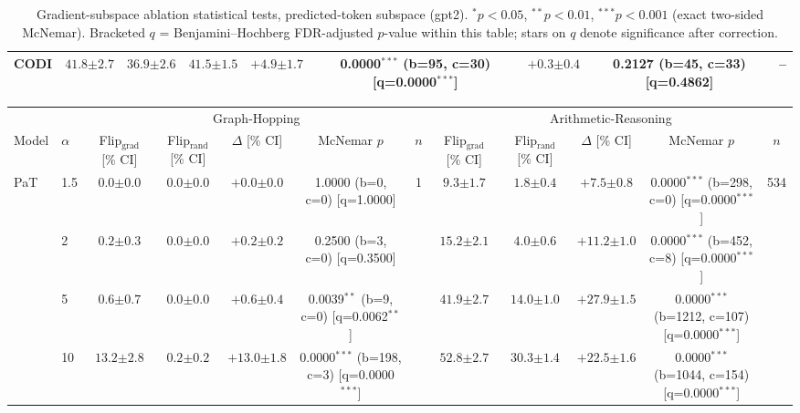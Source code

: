 \begin{table}[h!]
\begin{tabular}{l ccc cc cc c}
CODI & $41.8 {\scriptstyle \pm 2.7}$ & $36.9 {\scriptstyle \pm 2.6}$ & $41.5 {\scriptstyle \pm 1.5}$ & $+4.9 {\scriptstyle \pm 1.7}$ & 0.0000$^{***}$ (b=95, c=30) [q=0.0000$^{***}$] & $+0.3 {\scriptstyle \pm 0.4}$ & 0.2127 (b=45, c=33) [q=0.4862] & -- \\
\bottomrule
\end{tabular}
\caption{Gradient-subspace ablation statistical tests, predicted-token subspace (gpt2). $^{*}p{<}0.05$, $^{**}p{<}0.01$, $^{***}p{<}0.001$ (exact two-sided McNemar). Bracketed $q$ = Benjamini--Hochberg FDR-adjusted $p$-value within this table; stars on $q$ denote significance after correction.}
\label{tab:gradsubspace_predtoken_ablation_stats_gpt2}
\end{table}

\begin{table}[h!]
\centering
\tiny
\setlength{\tabcolsep}{3pt}
\begin{tabular}{l l | cccc c | cccc c}
\toprule
& & \multicolumn{5}{c}{Graph-Hopping} & \multicolumn{5}{c}{Arithmetic-Reasoning} \\
\cmidrule(lr){3-7} \cmidrule(lr){8-12}
Model & $\alpha$ & Flip$_{\text{grad}}$ [\% CI] & Flip$_{\text{rand}}$ [\% CI] & $\Delta$ [\% CI] & McNemar $p$ & $n$ & Flip$_{\text{grad}}$ [\% CI] & Flip$_{\text{rand}}$ [\% CI] & $\Delta$ [\% CI] & McNemar $p$ & $n$ \\
\midrule
PaT & 1.5 & $0.0 {\scriptstyle \pm 0.0}$ & $0.0 {\scriptstyle \pm 0.0}$ & $+0.0 {\scriptstyle \pm 0.0}$ & 1.0000 (b=0, c=0) [q=1.0000] & 1 & $9.3 {\scriptstyle \pm 1.7}$ & $1.8 {\scriptstyle \pm 0.4}$ & $+7.5 {\scriptstyle \pm 0.8}$ & 0.0000$^{***}$ (b=298, c=0) [q=0.0000$^{***}$] & 534 \\
 & 2 & $0.2 {\scriptstyle \pm 0.3}$ & $0.0 {\scriptstyle \pm 0.0}$ & $+0.2 {\scriptstyle \pm 0.2}$ & 0.2500 (b=3, c=0) [q=0.3500] &  & $15.2 {\scriptstyle \pm 2.1}$ & $4.0 {\scriptstyle \pm 0.6}$ & $+11.2 {\scriptstyle \pm 1.0}$ & 0.0000$^{***}$ (b=452, c=8) [q=0.0000$^{***}$] &  \\
 & 5 & $0.6 {\scriptstyle \pm 0.7}$ & $0.0 {\scriptstyle \pm 0.0}$ & $+0.6 {\scriptstyle \pm 0.4}$ & 0.0039$^{**}$ (b=9, c=0) [q=0.0062$^{**}$] &  & $41.9 {\scriptstyle \pm 2.7}$ & $14.0 {\scriptstyle \pm 1.0}$ & $+27.9 {\scriptstyle \pm 1.5}$ & 0.0000$^{***}$ (b=1212, c=107) [q=0.0000$^{***}$] &  \\
 & 10 & $13.2 {\scriptstyle \pm 2.8}$ & $0.2 {\scriptstyle \pm 0.2}$ & $+13.0 {\scriptstyle \pm 1.8}$ & 0.0000$^{***}$ (b=198, c=3) [q=0.0000$^{***}$] &  & $52.8 {\scriptstyle \pm 2.7}$ & $30.3 {\scriptstyle \pm 1.4}$ & $+22.5 {\scriptstyle \pm 1.6}$ & 0.0000$^{***}$ (b=1044, c=154) [q=0.0000$^{***}$] &  \\

\end{tabular}
\end{table}
